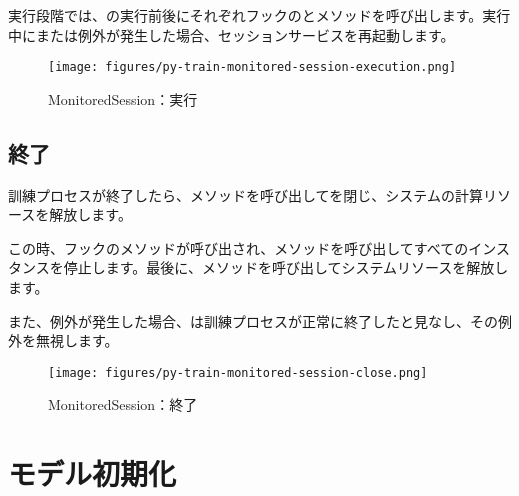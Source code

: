 \begin{content}
実行段階では、の実行前後にそれぞれフックのとメソッドを呼び出します。実行中にまたは例外が発生した場合、セッションサービスを再起動します。

\begin{figure}[!htbp]
\centering
\texttt{[image: figures/py-train-monitored-session-execution.png]}
\caption{MonitoredSession：実行}
 \label{fig:py-train-monitored-session-execution}
\end{figure}

\subsection{終了}

訓練プロセスが終了したら、メソッドを呼び出してを閉じ、システムの計算リソースを解放します。

この時、フックのメソッドが呼び出され、メソッドを呼び出してすべてのインスタンスを停止します。最後に、メソッドを呼び出してシステムリソースを解放します。

また、例外が発生した場合、は訓練プロセスが正常に終了したと見なし、その例外を無視します。

\begin{figure}[!htbp]
\centering
\texttt{[image: figures/py-train-monitored-session-close.png]}
\caption{MonitoredSession：終了}
 \label{fig:py-train-monitored-session-close}
\end{figure}

\end{content}

\section{モデル初期化}

